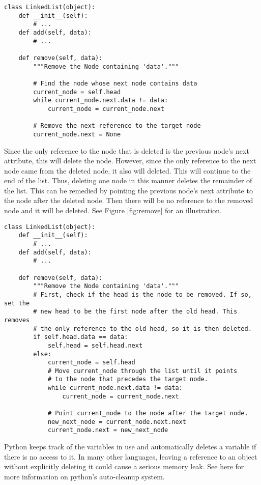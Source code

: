 \begin{lstlisting}
class LinkedList(object):
	def __init__(self):
		# ...
	def add(self, data):
		# ...

	def remove(self, data):
		"""Remove the Node containing 'data'."""

		# Find the node whose next node contains data
		current_node = self.head
		while current_node.next.data != data:
			current_node = current_node.next

		# Remove the next reference to the target node
		current_node.next = None
\end{lstlisting}

Since the only reference to the node that is deleted is the previous node's next attribute, this will delete the node.
However, since the only reference to the next node came from the deleted node, it also will deleted.
This will continue to the end of the list.
Thus, deleting one node in this manner deletes the remainder of the list.
This can be remedied by pointing the previous node's next attribute to the node after the deleted node.
Then there will be no reference to the removed node and it will be deleted. 
See Figure \ref{fig:remove} for an illustration.

\begin{lstlisting}
class LinkedList(object):
	def __init__(self):
		# ...
	def add(self, data):
		# ...

	def remove(self, data):
		"""Remove the Node containing 'data'."""
		# First, check if the head is the node to be removed. If so, set the
		# new head to be the first node after the old head. This removes
		# the only reference to the old head, so it is then deleted.
		if self.head.data == data:
			self.head = self.head.next
		else:
			current_node = self.head
			# Move current_node through the list until it points
			# to the node that precedes the target node.
			while current_node.next.data != data:
				current_node = current_node.next
	
			# Point current_node to the node after the target node.
			new_next_node = current_node.next.next
			current_node.next = new_next_node
\end{lstlisting}

\begin{warn}

Python keeps track of the variables in use and automatically deletes a variable if there is no access to it.
In many other languages, leaving a reference to an object without explicitly deleting it could cause a serious memory leak.
See \href{https://docs.python.org/2/library/gc.html}{here} for more information on python's auto-cleanup system.
\end{warn}

